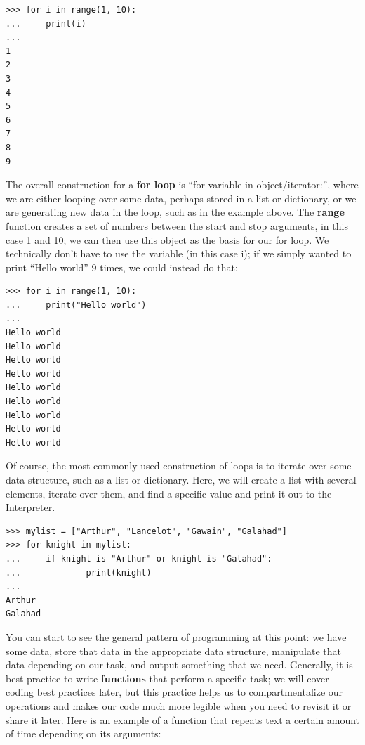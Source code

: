 \documentclass[a4paper,11pt]{article}
\begin{document}
\vspace{3mm}
\begin{lstlisting}
>>> for i in range(1, 10):
...     print(i)
... 
1
2
3
4
5
6
7
8
9
\end{lstlisting}
\vspace{3mm}

The overall construction for a \textbf{for loop} is ``for variable in object/iterator:'', where 
we are either looping over some data, perhaps stored in a list or dictionary, or we are generating 
new data in the loop, such as in the example above.  The \textbf{range} function creates a set of 
numbers between the start and stop arguments, in this case 1 and 10; we can then use this object 
as the basis for our for loop.  We technically don't have to use the variable (in this case i); 
if we simply wanted to print ``Hello world'' 9 times, we could instead do that:

\vspace{3mm}
\begin{lstlisting}
>>> for i in range(1, 10):
...     print("Hello world")
... 
Hello world
Hello world
Hello world
Hello world
Hello world
Hello world
Hello world
Hello world
Hello world
\end{lstlisting}
\vspace{3mm}

Of course, the most commonly used construction of loops is to iterate over some data structure, such 
as a list or dictionary.  Here, we will create a list with several elements, iterate over them, and 
find a specific value and print it out to the Interpreter.

\vspace{3mm}
\begin{lstlisting}
>>> mylist = ["Arthur", "Lancelot", "Gawain", "Galahad"]
>>> for knight in mylist:
...     if knight is "Arthur" or knight is "Galahad":
...             print(knight)
... 
Arthur
Galahad
\end{lstlisting}
\vspace{3mm}

You can start to see the general pattern of programming at this point: we have some data, store that data 
in the appropriate data structure, manipulate that data depending on our task, and output something 
that we need.  Generally, it is best practice to write \textbf{functions} that perform a specific task; 
we will cover coding best practices later, but this practice helps us to compartmentalize our 
operations and makes our code much more legible when you need to revisit it or share it later.  
Here is an example of a function that repeats text a certain amount of time depending on its 
arguments:
\end{document}
